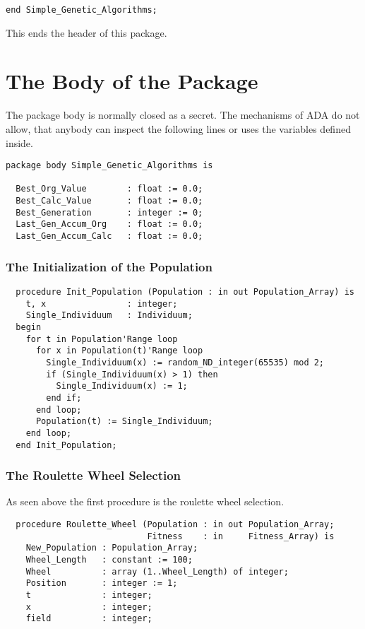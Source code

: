 \begin{enumerate}
\begin{verbatim}
end Simple_Genetic_Algorithms;
\end{verbatim}
This ends the header of this package.
\section{The Body of the Package}
The package body is normally closed as a secret. The mechanisms of ADA do not
allow, that anybody can inspect the following lines or uses the variables defined
inside.
\begin{verbatim}
package body Simple_Genetic_Algorithms is

  Best_Org_Value        : float := 0.0;
  Best_Calc_Value       : float := 0.0;
  Best_Generation       : integer := 0;
  Last_Gen_Accum_Org    : float := 0.0;
  Last_Gen_Accum_Calc   : float := 0.0;
\end{verbatim}
\subsubsection{The Initialization of the Population}
\begin{verbatim}
  procedure Init_Population (Population : in out Population_Array) is
    t, x                : integer;
    Single_Individuum   : Individuum;
  begin
    for t in Population'Range loop
      for x in Population(t)'Range loop
        Single_Individuum(x) := random_ND_integer(65535) mod 2;
        if (Single_Individuum(x) > 1) then
          Single_Individuum(x) := 1;
        end if;
      end loop;
      Population(t) := Single_Individuum;
    end loop;
  end Init_Population;
\end{verbatim}
\subsubsection{The Roulette Wheel Selection}
As seen above the first procedure is the roulette wheel selection.
\begin{verbatim}
  procedure Roulette_Wheel (Population : in out Population_Array;
                            Fitness    : in     Fitness_Array) is
    New_Population : Population_Array;
    Wheel_Length   : constant := 100;
    Wheel          : array (1..Wheel_Length) of integer;
    Position       : integer := 1;
    t              : integer;
    x              : integer;
    field          : integer;


\end{verbatim}
\end{enumerate}
